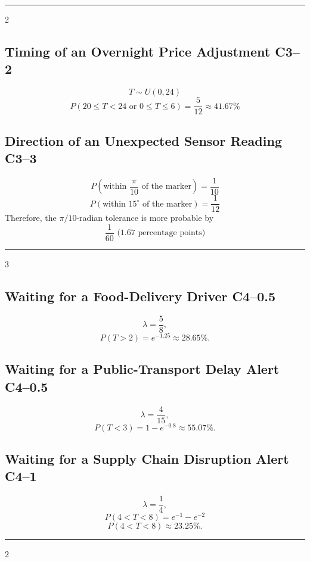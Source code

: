 {		\noindent\rule{\textwidth}{0.5pt}
		
		\begin{multicols}{2}
			\subsection{Timing of an Overnight Price Adjustment \hfill C3--2}
			\[
			T\sim U(0,24)
			\]\[
			\boxed{P(20\le T<24\text{ or }0\le T\le6)
			=\frac5{12}\approx41.67\%}
			\]

			\subsection{Direction of an Unexpected Sensor Reading \hfill C3--3}
			\[
			P\left(\text{within }\frac{\pi}{10}\text{ of the marker}\right)=\frac1{10}
			\]\[
			P\left(\text{within }15^\circ\text{ of the marker}\right)=\frac1{12}
			\]
			Therefore, the \(\pi/10\)-radian tolerance is more probable by
			\[
			\boxed{\frac1{60}\text{ (1.67 percentage points)}}
			\]
		\end{multicols}
		
		\noindent\rule{\textwidth}{0.5pt}
		
		\newpage

		\begin{multicols}{3}
			\subsection{Waiting for a Food-Delivery Driver \hfill C4--0.5}
			\[
			\lambda=\frac58,
			\]\[
			\boxed{P(T>2)=e^{-1.25}\approx28.65\%}.
			\]

			\subsection{Waiting for a Public-Transport Delay Alert \hfill C4--0.5}
			\[
			\lambda=\frac4{15},
			\]\[
			\boxed{P(T<3)=1-e^{-0.8}\approx55.07\%}.
			\]

			\subsection{Waiting for a Supply Chain Disruption Alert \hfill C4--1}
			\[
			\lambda=\frac14,
			\]\[
			P(4<T<8)=e^{-1}-e^{-2}
\]\[\boxed{P(4<T<8)\approx23.25\%}.
			\]
		\end{multicols}
		
		\noindent\rule{\textwidth}{0.5pt}

		\begin{multicols}{2}

\end{multicols}}
